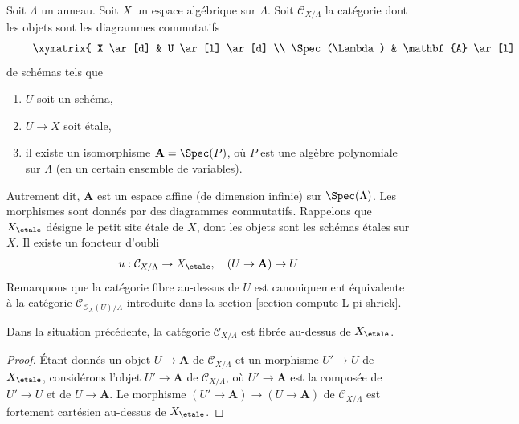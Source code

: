 \medskip\noindent
Soit $\Lambda$ un anneau. Soit $X$ un espace algébrique sur $\Lambda$. Soit
$\mathcal{C}_{X/\Lambda}$ la catégorie dont les objets sont les diagrammes
commutatifs
\begin{equation}
\label{equation-object-space}
\vcenter{
\xymatrix{
X \ar[d] & U \ar[l] \ar[d] \\
\Spec(\Lambda) & \mathbf{A} \ar[l]
}
}
\end{equation}
de schémas tels que
\begin{enumerate}
\item $U$ soit un schéma,
\item $U \to X$ soit étale,
\item il existe un isomorphisme $\mathbf{A} = \Spec(P)$, où $P$ est une
algèbre polynomiale sur $\Lambda$ (en un certain ensemble de variables).
\end{enumerate}
Autrement dit, $\mathbf{A}$ est un espace affine (de dimension infinie) sur
$\Spec(\Lambda)$. Les morphismes sont donnés par des diagrammes commutatifs.
Rappelons que $X_\etale$ désigne le petit site étale de $X$, dont les objets
sont les schémas étales sur $X$. Il existe un foncteur d'oubli
$$
u : \mathcal{C}_{X/\Lambda} \to X_\etale,
\quad
(U \to \mathbf{A}) \mapsto U
$$
Remarquons que la catégorie fibre au-dessus de $U$ est canoniquement
équivalente à la catégorie $\mathcal{C}_{\mathcal{O}_X(U)/\Lambda}$ introduite
dans la section \ref{section-compute-L-pi-shriek}.

\begin{lemma}
\label{lemma-category-fibred-space}
Dans la situation précédente, la catégorie $\mathcal{C}_{X/\Lambda}$ est
fibrée au-dessus de $X_\etale$.
\end{lemma}

\begin{proof}
Étant donnés un objet $U \to \mathbf{A}$ de $\mathcal{C}_{X/\Lambda}$ et un
morphisme $U' \to U$ de $X_\etale$, considérons l'objet
$U' \to \mathbf{A}$ de $\mathcal{C}_{X/\Lambda}$, où
$U' \to \mathbf{A}$ est la composée de $U' \to U$ et de
$U \to \mathbf{A}$. Le morphisme
$(U' \to \mathbf{A}) \to (U \to \mathbf{A})$ de
$\mathcal{C}_{X/\Lambda}$ est fortement cartésien au-dessus de $X_\etale$.
\end{proof}

